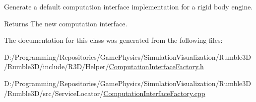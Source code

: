 Generate a default computation interface implementation for a rigid body engine. 

\begin{DoxyReturn}{Returns}
The new computation interface. 
\end{DoxyReturn}


The documentation for this class was generated from the following files\+:\begin{DoxyCompactItemize}
\item 
D\+:/\+Programming/\+Repositories/\+Game\+Physics/\+Simulation\+Visualization/\+Rumble3\+D/\+Rumble3\+D/include/\+R3\+D/\+Helper/\mbox{\hyperlink{_computation_interface_factory_8h}{Computation\+Interface\+Factory.\+h}}\item 
D\+:/\+Programming/\+Repositories/\+Game\+Physics/\+Simulation\+Visualization/\+Rumble3\+D/\+Rumble3\+D/src/\+Service\+Locator/\mbox{\hyperlink{_computation_interface_factory_8cpp}{Computation\+Interface\+Factory.\+cpp}}\end{DoxyCompactItemize}
